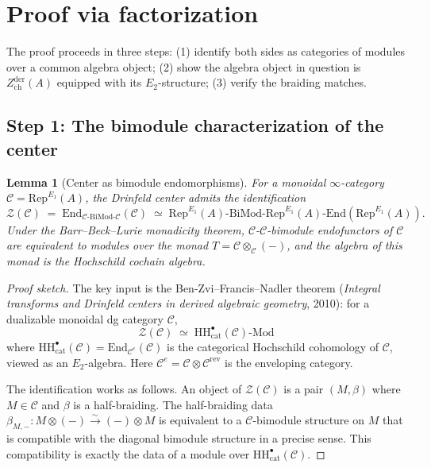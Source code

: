 \documentclass[11pt]{article}
\newtheorem{lemma}[theorem]{Lemma}
\theoremstyle{definition}
\theoremstyle{remark}
\newcommand{\Mod}{\mathrm{Mod}}
\newcommand{\Rep}{\mathrm{Rep}}
\newcommand{\HH}{\mathrm{HH}}
\newcommand{\End}{\mathrm{End}}
\newcommand{\cC}{\mathcal{C}}
\newcommand{\cZ}{\mathcal{Z}}
\newcommand{\Zder}{Z^{\mathrm{der}}_{\mathrm{ch}}}
\newcommand{\BiMod}{\mathrm{BiMod}}
\begin{document}
\section{Proof via factorization}
\label{sec:factorization-proof}

The proof proceeds in three steps: (1) identify both sides as categories of modules over a common algebra object; (2) show the algebra object in question is $\Zder(A)$ equipped with its $E_2$-structure; (3) verify the braiding matches.

\subsection{Step 1: The bimodule characterization of the center}

\begin{lemma}[Center as bimodule endomorphisms]
\label{lem:center-bimod}
For a monoidal $\infty$-category $\cC = \Rep^{E_1}(A)$, the Drinfeld center admits the identification
\[
 \cZ(\cC) \;=\; \End_{\cC\text{-}\BiMod\text{-}\cC}(\cC) \;\simeq\; \Rep^{E_1}(A)\text{-}\BiMod\text{-}\Rep^{E_1}(A)\text{-}\End(\Rep^{E_1}(A)).
\]
Under the Barr--Beck--Lurie monadicity theorem, $\cC$-$\cC$-bimodule endofunctors of $\cC$ are equivalent to modules over the monad $T = \cC \otimes_\cC (-)$, and the algebra of this monad is the Hochschild cochain algebra.
\end{lemma}

\begin{proof}[Proof sketch]
The key input is the Ben-Zvi--Francis--Nadler theorem (\emph{Integral transforms and Drinfeld centers in derived algebraic geometry}, 2010): for a dualizable monoidal dg category $\cC$,
\begin{equation}
\label{eq:bzfn}
 \cZ(\cC) \;\simeq\; \HH^\bullet_{\mathrm{cat}}(\cC)\text{-}\Mod
\end{equation}
where $\HH^\bullet_{\mathrm{cat}}(\cC) = \End_{\cC^e}(\cC)$ is the categorical Hochschild cohomology of $\cC$, viewed as an $E_2$-algebra. Here $\cC^e = \cC \otimes \cC^{\mathrm{rev}}$ is the enveloping category.

The identification works as follows. An object of $\cZ(\cC)$ is a pair $(M, \beta)$ where $M \in \cC$ and $\beta$ is a half-braiding. The half-braiding data $\beta_{M,-} \colon M \otimes (-) \xrightarrow{\sim} (-) \otimes M$ is equivalent to a $\cC$-bimodule structure on $M$ that is compatible with the diagonal bimodule structure in a precise sense. This compatibility is exactly the data of a module over $\HH^\bullet_{\mathrm{cat}}(\cC)$.
\end{proof}
\end{document}
